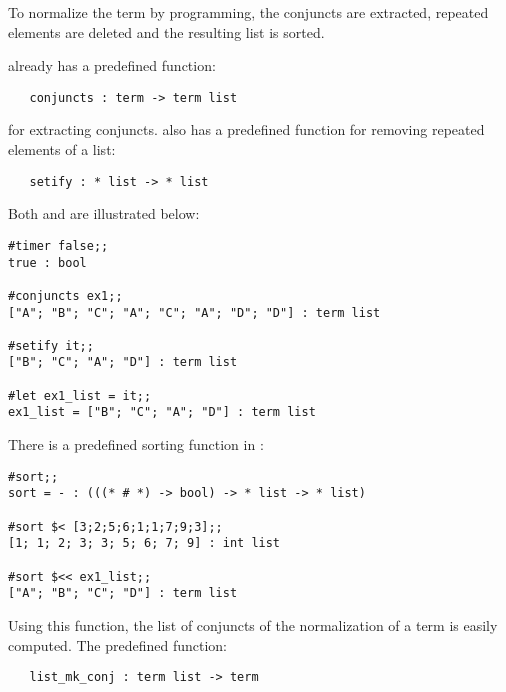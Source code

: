 To normalize the term by \ML{} programming, the conjuncts are extracted,
repeated elements are deleted and the resulting list is sorted.

\HOL{} already has a predefined function:

\begin{hol}\begin{verbatim}
   conjuncts : term -> term list
\end{verbatim}\end{hol}

\noindent for extracting conjuncts.
\HOL{} also has a predefined \ML{} function for removing repeated elements of
a list:


\begin{hol}\begin{verbatim}
   setify : * list -> * list
\end{verbatim}\end{hol}

\noindent Both  and  are illustrated below:

\begin{session}\begin{verbatim}
#timer false;;
true : bool

#conjuncts ex1;;
["A"; "B"; "C"; "A"; "C"; "A"; "D"; "D"] : term list

#setify it;;
["B"; "C"; "A"; "D"] : term list

#let ex1_list = it;;
ex1_list = ["B"; "C"; "A"; "D"] : term list
\end{verbatim}\end{session}

There is a predefined sorting function in \ML:

\begin{session}\begin{verbatim}
#sort;; 
sort = - : (((* # *) -> bool) -> * list -> * list)

#sort $< [3;2;5;6;1;1;7;9;3];;
[1; 1; 2; 3; 3; 5; 6; 7; 9] : int list

#sort $<< ex1_list;;
["A"; "B"; "C"; "D"] : term list
\end{verbatim}\end{session}

Using this function, the list of conjuncts of the normalization of a
term is easily computed.  The predefined \ML{} function:

\begin{hol}\begin{verbatim}
   list_mk_conj : term list -> term
\end{verbatim}\end{hol}

